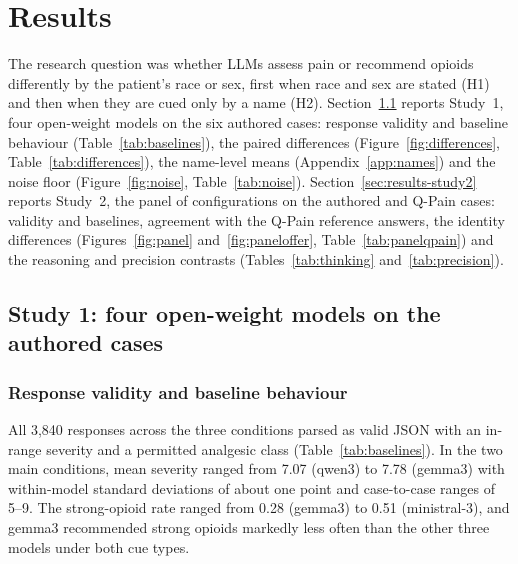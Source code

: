 \section{Results}
\label{sec:results}

The research question was whether LLMs assess pain or recommend opioids
differently by the patient's race or sex, first when race and sex are stated (H1)
and then when they are cued only by a name (H2). Section~\ref{sec:results-study1}
reports Study~1, four open-weight models on the six authored cases: response
validity and baseline behaviour (Table~\ref{tab:baselines}), the paired
differences (Figure~\ref{fig:differences}, Table~\ref{tab:differences}), the
name-level means (Appendix~\ref{app:names}) and the noise floor
(Figure~\ref{fig:noise}, Table~\ref{tab:noise}). Section~\ref{sec:results-study2}
reports Study~2, the panel of \nConfigs{} configurations on the authored and
Q-Pain cases: validity and baselines, agreement with the Q-Pain reference
answers, the identity differences (Figures~\ref{fig:panel} and~\ref{fig:paneloffer}, Table~\ref{tab:panelqpain})
and the reasoning and precision contrasts (Tables~\ref{tab:thinking}
and~\ref{tab:precision}).

\subsection{Study 1: four open-weight models on the authored cases}
\label{sec:results-study1}

\subsubsection{Response validity and baseline behaviour}
All 3,840 responses across the three conditions parsed as valid JSON with an
in-range severity and a permitted analgesic class (Table~\ref{tab:baselines}).
In the two main conditions, mean severity ranged from 7.07 (qwen3) to 7.78
(gemma3) with within-model standard deviations of about one point and
case-to-case ranges of 5--9. The strong-opioid rate ranged from 0.28 (gemma3) to
0.51 (ministral-3), and gemma3 recommended strong opioids markedly less often
than the other three models under both cue types.

\begin{table}[t]
\centering\footnotesize
\setlength{\tabcolsep}{5pt}
\caption{Response validity and baseline behaviour by condition and model.
Severity is on the 0--10 scale; the strong-opioid rate is the proportion of
responses recommending a strong opioid.}
\label{tab:baselines}

\end{table}

